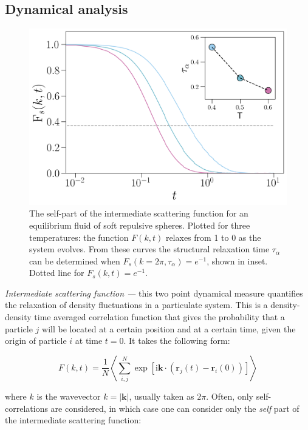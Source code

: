 \subsection{Dynamical analysis}
\label{section:DynamicalAnalysis}


\begin{figure}
	\includegraphics[width=0.8\linewidth]{chapters/colloids/figsColloids/figISF_example.png}
	\centering
	\caption[Intermediate scattering function.]{The self-part of the intermediate scattering function for an equilibrium fluid of soft repulsive spheres. Plotted for three temperatures: the function $F(k,t)$ relaxes from 1 to 0 as the system evolves. From these curves the structural relaxation time $\tau_\alpha$ can be determined when $F_s(k = 2\pi, \tau_{\alpha}) = e^{-1}$, shown in inset. Dotted line for $F_s(k,t) = e^{-1}$. }
	\label{fig:ISFs}

\end{figure}

\textit{Intermediate scattering function ---} this two point dynamical measure quantifies the relaxation of density fluctuations in a particulate system. This is a density-density time averaged correlation function that gives the probability that a particle $j$ will be located at a certain position and at a certain time, given the origin of particle $i$ at time $t=0$. It takes the following form:

\begin{equation}
  	F(k, t)=\frac{1}{N}\left\langle\sum_{i,j}^{N} \exp \left[\mathrm{i} \mathbf{k} \cdot\left(\mathbf{r}_{j}(t)-\mathbf{r}_{i}(0)\right)\right]\right\rangle
\end{equation}

\noindent where $k$ is the wavevector $k=|\mathbf{k}|$, usually taken as $2\pi$. Often, only self-correlations are considered, in which case one can consider only the \textit{self} part of the intermediate scattering function:

